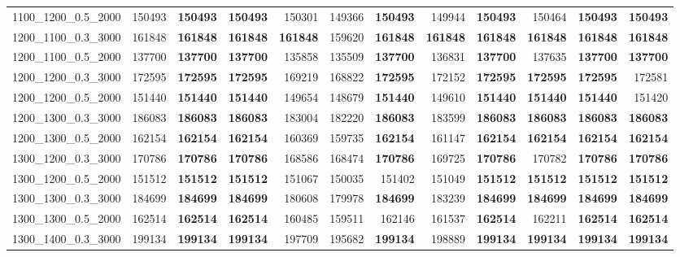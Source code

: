 \begin{landscape}
\begin{longtable}{lrrrrrrrrrrr}
1100\_1200\_0.5\_2000 & 150493 & \textbf{150493} & \textbf{150493} & 150301 & 149366 & \textbf{150493} & 149944 & \textbf{150493} & 150464 & \textbf{150493} & \textbf{150493}\\
1200\_1100\_0.3\_3000 & 161848 & \textbf{161848} & \textbf{161848} & \textbf{161848} & 159620 & \textbf{161848} & \textbf{161848} & \textbf{161848} & \textbf{161848} & \textbf{161848} & \textbf{161848}\\
1200\_1100\_0.5\_2000 & 137700 & \textbf{137700} & \textbf{137700} & 135858 & 135509 & \textbf{137700} & 136831 & \textbf{137700} & 137635 & \textbf{137700} & \textbf{137700}\\
1200\_1200\_0.3\_3000 & 172595 & \textbf{172595} & \textbf{172595} & 169219 & 168822 & \textbf{172595} & 172152 & \textbf{172595} & \textbf{172595} & \textbf{172595} & 172581\\
1200\_1200\_0.5\_2000 & 151440 & \textbf{151440} & \textbf{151440} & 149654 & 148679 & \textbf{151440} & 149610 & \textbf{151440} & \textbf{151440} & \textbf{151440} & 151420\\
1200\_1300\_0.3\_3000 & 186083 & \textbf{186083} & \textbf{186083} & 183004 & 182220 & \textbf{186083} & 183599 & \textbf{186083} & \textbf{186083} & \textbf{186083} & \textbf{186083}\\
1200\_1300\_0.5\_2000 & 162154 & \textbf{162154} & \textbf{162154} & 160369 & 159735 & \textbf{162154} & 161147 & \textbf{162154} & \textbf{162154} & \textbf{162154} & \textbf{162154}\\
1300\_1200\_0.3\_3000 & 170786 & \textbf{170786} & \textbf{170786} & 168586 & 168474 & \textbf{170786} & 169725 & \textbf{170786} & 170782 & \textbf{170786} & \textbf{170786}\\
1300\_1200\_0.5\_2000 & 151512 & \textbf{151512} & \textbf{151512} & 151067 & 150035 & 151402 & 151049 & \textbf{151512} & \textbf{151512} & \textbf{151512} & \textbf{151512}\\
1300\_1300\_0.3\_3000 & 184699 & \textbf{184699} & \textbf{184699} & 180608 & 179978 & \textbf{184699} & 183239 & \textbf{184699} & \textbf{184699} & \textbf{184699} & \textbf{184699}\\
1300\_1300\_0.5\_2000 & 162514 & \textbf{162514} & \textbf{162514} & 160485 & 159511 & 162146 & 161537 & \textbf{162514} & 162211 & \textbf{162514} & \textbf{162514}\\
1300\_1400\_0.3\_3000 & 199134 & \textbf{199134} & \textbf{199134} & 197709 & 195682 & \textbf{199134} & 198889 & \textbf{199134} & \textbf{199134} & \textbf{199134} & \textbf{199134}\\

\end{longtable}
\end{landscape}
